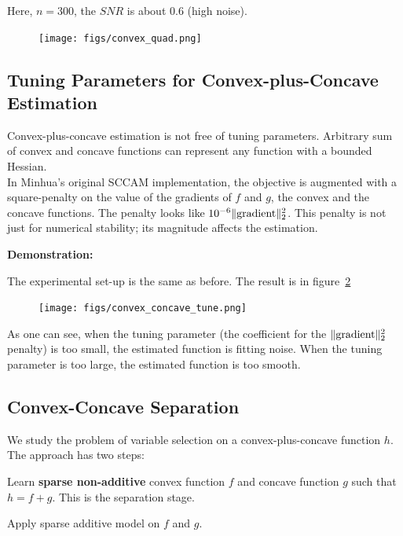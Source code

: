 \documentclass{article}
\begin{document}
{Here, $n=300$, the $SNR$ is about $0.6$ (high noise).  \\


\begin{figure}[htp]
\label{fig:quad}
\centering
\texttt{[image: figs/convex\_quad.png]}
\end{figure}

\subsection{Tuning Parameters for Convex-plus-Concave Estimation}

Convex-plus-concave estimation is not free of tuning parameters. Arbitrary sum of convex and concave functions can represent any function with a bounded Hessian.\\

In Minhua's original SCCAM implementation, the objective is augmented with a square-penalty on the value of the gradients of $f$ and $g$, the convex and the concave functions. The penalty looks like $10^{-6} \| \textrm{gradient} \|_2^2$. This penalty is not just for numerical stability; its magnitude affects the estimation. 

\textbf{Demonstration:}

The experimental set-up is the same as before. The result is in figure~\ref{fig:tuning}

\begin{figure}[htp]
\label{fig:tuning}
\centering
\texttt{[image: figs/convex\_concave\_tune.png]}
\end{figure}

As one can see, when the tuning parameter (the coefficient for the $\| \textrm{gradient} \|_2^2$ penalty) is too small, the estimated function is fitting noise. When the tuning parameter is too large, the estimated function is too smooth.

\subsection{Convex-Concave Separation}

We study the problem of variable selection on a convex-plus-concave function $h$. The approach has two steps: 
\begin{packed_enum}
\item Learn \textbf{sparse non-additive} convex function $f$ and concave function $g$ such that $h = f + g$. This is the separation stage.
\item Apply sparse additive model on $f$ and $g$.
\end{packed_enum}

}
\end{document}
